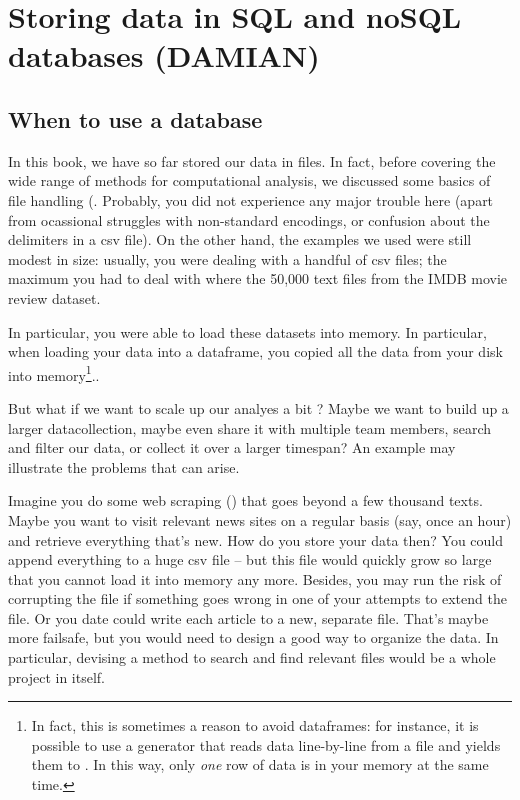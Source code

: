 \section{Storing data in SQL and noSQL databases (DAMIAN)}
\label{sec:databases}

\subsection{When to use a database}
In this book, we have so far stored our data in files. In fact, before
covering the wide range of methods for computational analysis, we
discussed some basics of file handling
(. Probably, you did not experience any major
trouble here (apart from ocassional struggles with non-standard
encodings, or confusion about the delimiters in a csv file). On the
other hand, the examples we used were still modest in size: usually,
you were dealing with a handful of csv files; the maximum you had to
deal with where the 50,000 text files from the IMDB movie review
dataset.

In particular, you were able to load these datasets into memory. In
particular, when loading your data into a dataframe, you copied all
the data from your disk into memory\footnote{In fact, this is
  sometimes a reason to avoid dataframes: for instance, it is possible
  to use a generator that reads data line-by-line from a file and
  yields them to . In this way, only \emph{one} row
  of data is in your memory at the same time.}..

But what if we want to scale up our analyes a bit
\cite[see][]{Trilling2018b}? Maybe we want to build up a larger
datacollection, maybe even share it with multiple team members, search
and filter our data, or collect it over a larger timespan? An
example may illustrate the problems that can arise.

Imagine you do some web scraping () that goes beyond
a few thousand texts. Maybe you want to visit relevant news sites on a
regular basis (say, once an hour) and retrieve everything that's
new. How do you store your data then? You could append everything to a
huge csv file -- but this file would quickly grow so large that you
cannot load it into memory any more. Besides, you may run the risk of
corrupting the file if something goes wrong in one of your attempts to
extend the file. Or you date could write each article to a new, separate file.
That's maybe more failsafe, but you would need to design a good way
to organize the data. In particular, devising a method to search
and find relevant files would be a whole project in itself.

